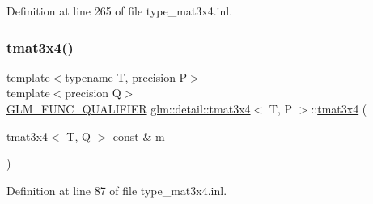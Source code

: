 Definition at line 265 of file type\+\_\+mat3x4.\+inl.

\mbox{\label{structglm_1_1detail_1_1tmat3x4_affba87d33eccb3e78c8629791c7fc158}} 
\subsubsection{\texorpdfstring{tmat3x4()}{tmat3x4()}\hspace{0.1cm}{\footnotesize\ttfamily [19/22]}}
{\footnotesize\ttfamily template$<$typename T, precision P$>$ \\
template$<$precision Q$>$ \\
\hyperlink{setup_8hpp_a33fdea6f91c5f834105f7415e2a64407}{G\+L\+M\+\_\+\+F\+U\+N\+C\+\_\+\+Q\+U\+A\+L\+I\+F\+I\+ER} \hyperlink{structglm_1_1detail_1_1tmat3x4}{glm\+::detail\+::tmat3x4}$<$ T, P $>$\+::\hyperlink{structglm_1_1detail_1_1tmat3x4}{tmat3x4} (\begin{DoxyParamCaption}\item[{\hyperlink{structglm_1_1detail_1_1tmat3x4}{tmat3x4}$<$ T, Q $>$ const \&}]{m }\end{DoxyParamCaption})}



Definition at line 87 of file type\+\_\+mat3x4.\+inl.

\mbox{\label{structglm_1_1detail_1_1tmat3x4_a16b2c248a1909f7f319b8e050f93e3b4}} 
